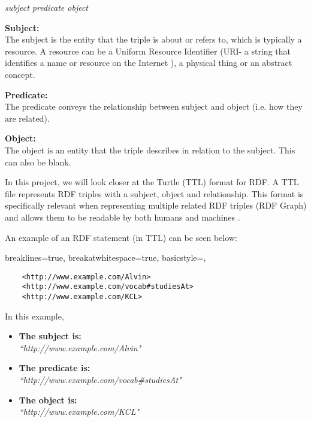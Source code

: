 \vspace{-0.1cm}
\begin{center}
   \textit{subject predicate object}
\end{center}
\vspace{-0.2cm}

\noindent \textbf{Subject:} \\
\hspace*{0.5cm} The subject is the entity that the triple is about or refers to, which is typically a resource. A resource can be a Uniform Resource Identifier (URI- a string that identifies a name or resource on the Internet \cite{sikos_2015}), a physical thing or an abstract concept. 

\noindent \textbf{Predicate:} \\
\hspace*{0.5cm} The predicate conveys the relationship between subject and object (i.e. how they are related). 

\noindent \textbf{Object:} \\
\hspace*{0.5cm} The object is an entity that the triple describes in relation to the subject. This can also be blank. 

In this project, we will look closer at the Turtle (TTL) format for RDF. A TTL file represents RDF triples with a subject, object and relationship. This format is specifically relevant when representing multiple related RDF triples (RDF Graph) and allows them to be readable by both humans and machines \cite{TTL}.

An example of an RDF statement (in TTL) can be seen below:

\vspace{-0.4cm}
\begin{center}
\lstset
{
    breaklines=true,
    breakatwhitespace=true,
    basicstyle=\linespread{1.5}\ttfamily,
}
\begin{lstlisting}
    <http://www.example.com/Alvin> 
    <http://www.example.com/vocab#studiesAt> 
    <http://www.example.com/KCL>
\end{lstlisting}
\end{center} 
\vspace{-0.3cm}

\noindent In this example, 
\vspace{-0.15cm}
\begin{itemize}
    \itemsep0em 
\item \textbf{The subject is:} \\ \textit{``http://www.example.com/Alvin"}
\item \textbf{The predicate is:} \\ \textit{``http://www.example.com/vocab\#studiesAt"}
\item \textbf{The object is:} \\ \textit{``http://www.example.com/KCL"}
\end{itemize}
\vspace{-0.1cm}

